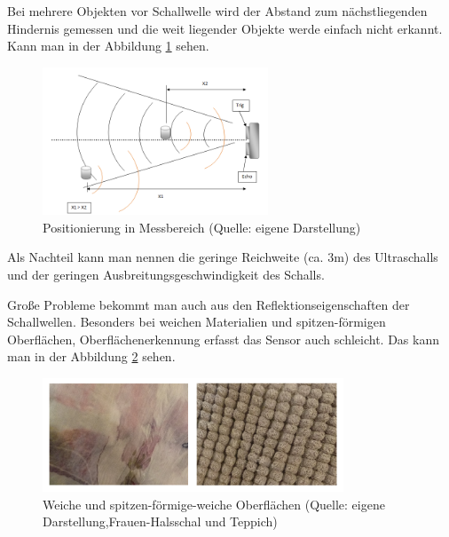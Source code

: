 Bei mehrere Objekten vor Schallwelle wird der Abstand zum nächstliegenden Hindernis gemessen und die weit liegender Objekte werde einfach nicht erkannt. Kann man in der Abbildung \ref{bild_3} sehen.


\begin{figure}[ht]  %
	\centering\includegraphics[width=0.6\textwidth]{images/Bild-3.png}
	\caption{Positionierung in Messbereich \newline (Quelle: eigene Darstellung)}
	\label{bild_3} %
\end{figure}

Als Nachteil kann man nennen die geringe Reichweite (ca. 3m) des Ultraschalls und  der geringen Ausbreitungsgeschwindigkeit des Schalls.

Große Probleme bekommt man auch aus den Reflektionseigenschaften der Schallwellen. Besonders bei weichen Materialien und spitzen-förmigen Oberflächen,
Oberflächenerkennung erfasst das Sensor auch schleicht. Das kann man in der Abbildung \ref{bild_4} sehen.

\begin{figure}[!h]  %
	\centering\includegraphics[width=0.8\textwidth]{images/Bild-4-5.png}
	\caption{Weiche und spitzen-förmige-weiche Oberflächen \newline(Quelle: eigene Darstellung,Frauen-Halsschal und Teppich)}
	\label{bild_4}
\end{figure}

